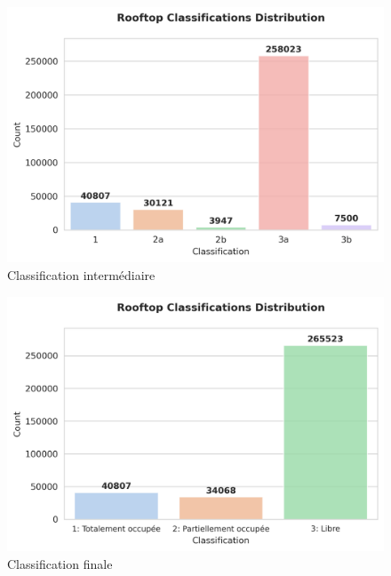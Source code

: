 \begin{figure}[H]
    \centering
    \includegraphics[width=1\linewidth]{02-main//figures/ch3_piste_exploree_classification_05_classification_intermediaire.png}
    \caption{Classification intermédiaire}
    \label{fig:ch3_piste_exploree_classification_05_classification_simplified}
\end{figure}

\begin{figure}[H]
    \centering
    \includegraphics[width=1\linewidth]{02-main//figures/ch3_piste_exploree_classification_06_classification_finale.png}
    \caption{Classification finale}
    \label{fig:ch3_piste_exploree_classification_06_classification_finale}
\end{figure}

